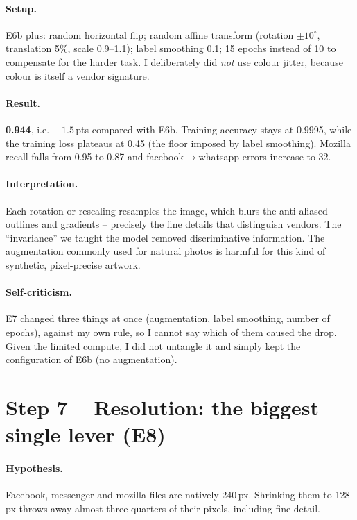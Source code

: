 \documentclass[11pt,a4paper]{article}
\newcommand{\pt}{\,pts}
\begin{document}
\paragraph{Setup.} E6b plus: random horizontal flip; random affine transform (rotation
$\pm10^\circ$, translation 5\%, scale 0.9--1.1); label smoothing 0.1; 15 epochs instead of 10 to
compensate for the harder task. I deliberately did \emph{not} use colour jitter, because colour is
itself a vendor signature.

\paragraph{Result.} \textbf{0.944}, i.e.\ $-1.5$\pt{} compared with E6b. Training accuracy stays at
0.9995, while the training loss plateaus at 0.45 (the floor imposed by label smoothing). Mozilla
recall falls from 0.95 to 0.87 and facebook$\to$whatsapp errors increase to 32.

\paragraph{Interpretation.} Each rotation or rescaling resamples the image, which blurs the
anti-aliased outlines and gradients -- precisely the fine details that distinguish vendors. The
``invariance'' we taught the model removed discriminative information. The augmentation commonly
used for natural photos is harmful for this kind of synthetic, pixel-precise artwork.

\paragraph{Self-criticism.} E7 changed three things at once (augmentation, label smoothing, number of
epochs), against my own rule, so I cannot say which of them caused the drop. Given the limited
compute, I did not untangle it and simply kept the configuration of E6b (no augmentation).

\section{Step 7 -- Resolution: the biggest single lever (E8)}

\paragraph{Hypothesis.} Facebook, messenger and mozilla files are natively 240\,px. Shrinking them to
128\,px throws away almost three quarters of their pixels, including fine detail.
\end{document}
